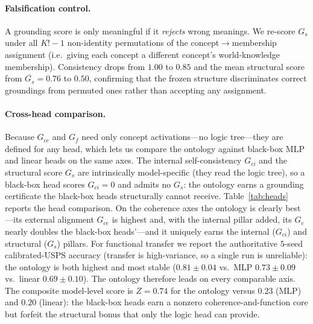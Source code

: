 \paragraph{Falsification control.}
A grounding score is only meaningful if it \emph{rejects} wrong meanings. We
re-score $G_s$ under all $K!\!-\!1$ non-identity permutations of the
concept$\to$membership assignment (i.e.\ giving each concept a different concept's
world-knowledge membership). Consistency drops from $1.00$ to $0.85$ and the mean
structural score from $\overline{G_s}=0.76$ to $0.50$, confirming that the frozen
structure discriminates correct groundings from permuted ones rather than
accepting any assignment.

\paragraph{Cross-head comparison.}
Because $G_{ce}$ and $G_f$ need only concept activations---no logic tree---they are
defined for any head, which lets us compare the ontology against black-box MLP and
linear heads on the same axes. The internal self-consistency $G_{ci}$ and the
structural score $G_s$ are intrinsically model-specific (they read the logic tree),
so a black-box head scores $G_{ci}{=}0$ and admits no $G_s$: the ontology earns a
grounding certificate the black-box heads structurally cannot receive.
Table~\ref{tab:heads} reports the head comparison. On the coherence axes the
ontology is clearly best---its external alignment $G_{ce}$ is highest and, with the
internal pillar added, its $G_c$ nearly doubles the black-box heads'---and it
uniquely earns the internal ($G_{ci}$) and structural ($G_s$) pillars. For
functional transfer we report the authoritative $5$-seed calibrated-USPS accuracy
(transfer is high-variance, so a single run is unreliable): the ontology is both
highest and most stable ($0.81{\pm}0.04$ vs.\ MLP $0.73{\pm}0.09$ vs.\ linear
$0.69{\pm}0.10$). The ontology therefore leads on every comparable axis. The
composite model-level score is $Z=0.74$ for the ontology versus $0.23$ (MLP) and
$0.20$ (linear): the black-box heads earn a nonzero coherence-and-function core but
forfeit the structural bonus that only the logic head can provide.

